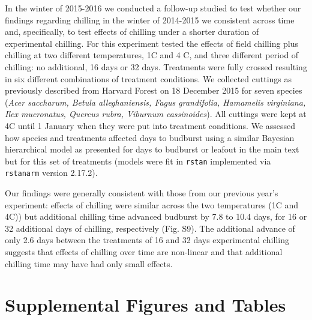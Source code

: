 \documentclass{article}
\begin{document}
\noindent In the winter of 2015-2016 we conducted a follow-up studied to test whether our findings regarding chilling in the winter of 2014-2015 we consistent across time and, specifically, to test effects of chilling under a shorter duration of experimental chilling.  For this experiment tested the effects of field chilling plus chilling at two different temperatures, 1\degree C and 4 \degree C, and three different period of chilling: no additional, 16 days or 32 days. Treatments were fully crossed resulting in six different combinations of treatment conditions. We collected cuttings as previously described from Harvard Forest on 18 December 2015 for seven species (\emph{Acer saccharum, Betula alleghaniensis, Fagus grandifolia, Hamamelis virginiana, Ilex mucronatus, Quercus rubra, Viburnum cassinoides}). All cuttings were kept at 4\degree C until 1 January when they were put into treatment conditions. We assessed how species and treatments affected days to budburst using a similar Bayesian hierarchical model as presented for days to budburst or leafout in the main text but for this set of treatments (models were fit in \verb|rstan| implemented via  \verb|rstanarm| version 2.17.2). 

\noindent Our findings were generally consistent with those from our previous year's experiment: effects of chilling were similar across the two temperatures (1\degree C and 4\degree C)) but additional chilling time advanced budburst by 7.8 to 10.4 days, for 16 or 32 additional days of chilling, respectively (Fig. S9). The additional advance of only 2.6 days between the treatments of 16 and 32 days experimental chilling suggests that effects of chilling over time are non-linear and that additional chilling time may have had only small effects. 








\newpage
\section*{Supplemental Figures and Tables}
\end{document}
